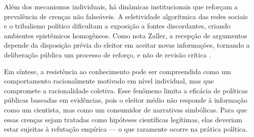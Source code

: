 Além dos mecanismos individuais, há dinâmicas institucionais que reforçam a prevalência de crenças não falseáveis. A seletividade algorítmica das redes sociais e o tribalismo político dificultam a exposição a fontes discordantes, criando ambientes epistêmicos homogêneos. Como nota Zaller, a recepção de argumentos depende da disposição prévia do eleitor em aceitar novas informações, tornando a deliberação pública um processo de reforço, e não de revisão crítica \cite{zaller1992nature}.

Em síntese, a resistência ao conhecimento pode ser compreendida como um comportamento racionalmente motivado em nível individual, mas que compromete a racionalidade coletiva. Esse fenômeno limita a eficácia de políticas públicas baseadas em evidências, pois o eleitor médio não responde à informação como um cientista, mas como um consumidor de narrativas simbólicas. Para que essas crenças sejam tratadas como hipóteses científicas legítimas, elas deveriam estar sujeitas à refutação empírica — o que raramente ocorre na prática política.
